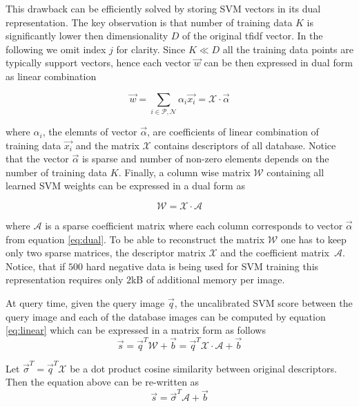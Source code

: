       This drawback can be efficiently solved by storing SVM vectors in its dual representation. The key observation is that number of training data $K$ is significantly lower then dimensionality $D$ of the original tfidf vector. In the following we omit index $j$ for clarity. Since $K\ll D$ all the training data points are typically support vectors, hence each vector $\vec{w}$ can be then expressed in dual form as linear combination

      \begin{equation}
        \vec{w}=\sum_{i\in \mathcal{P},\mathcal{N}} \alpha_i \vec{x_i} = \mathcal{X} \cdot \vec{\alpha}
        \label{eq:dual}
      \end{equation}

      \noindent
      where $\alpha_i$, the elemnts of vector $\vec{\alpha}$, are coefficients of linear combination of training data $\vec{x_i}$ and the matrix $\mathcal{X}$ contains descriptors of all database. Notice that the vector $\vec{\alpha}$ is sparse and number of non-zero elements depends on the number of training data $K$. Finally, a column wise matrix $\mathcal{W}$ containing all learned SVM weights can be expressed in a dual form as

      \begin{equation}
        \mathcal{W} = \mathcal{X}\cdot \mathcal{A}  
      \end{equation}

      \noindent
      where $\mathcal{A}$ is a sparse coefficient matrix where each column corresponds to vector $\vec{\alpha}$ from equation \eqref{eq:dual}. To be able to reconstruct the matrix $\mathcal{W}$ one has to keep only two sparse matrices, the descriptor matrix $\mathcal{X}$ and the coefficient matrix~$\mathcal{A}$. Notice, that if $500$ hard negative data is being used for SVM training this representation requires only $2$kB of additional memory per image. 

      At query time, given the query image $\vec{q}$, the uncalibrated SVM score between the query image and each of the database images can be computed by equation \eqref{eq:linear} which can be expressed in a matrix form as follows
      \begin{equation}
        \vec{s}=\vec{q}^T \mathcal{W}+\vec{b}=\vec{q}^T \mathcal{X}\cdot \mathcal{A}+\vec{b}
      \end{equation}

      Let $\vec{\sigma}^T=\vec{q}^T \mathcal{X}$ be a dot product cosine similarity between original descriptors. Then the equation above can be re-written as
      \begin{equation}
        \vec{s}=\vec{\sigma}^T \mathcal{A}+\vec{b}
      \end{equation}

